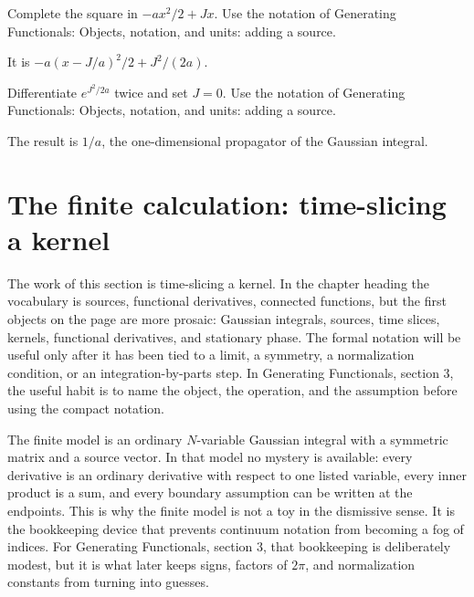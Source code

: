 \begin{exercise}
Complete the square in \(-ax^2/2+Jx\).  Use the notation of Generating Functionals: Objects, notation, and units: adding a source.
\begin{answer}
It is \(-a(x-J/a)^2/2+J^2/(2a)\).
\end{answer}
\end{exercise}

\begin{exercise}
Differentiate \(e^{J^2/2a}\) twice and set \(J=0\).  Use the notation of Generating Functionals: Objects, notation, and units: adding a source.
\begin{answer}
The result is \(1/a\), the one-dimensional propagator of the Gaussian integral.
\end{answer}
\end{exercise}



\section{The finite calculation: time-slicing a kernel}













The work of this section is time-slicing a kernel.  In the chapter heading the vocabulary is sources, functional derivatives, connected functions, but the first objects on the page are more prosaic: Gaussian integrals, sources, time slices, kernels, functional derivatives, and stationary phase.  The formal notation will be useful only after it has been tied to a limit, a symmetry, a normalization condition, or an integration-by-parts step.  In Generating Functionals, section 3, the useful habit is to name the object, the operation, and the assumption before using the compact notation.

The finite model is an ordinary \(N\)-variable Gaussian integral with a symmetric matrix and a source vector.  In that model no mystery is available: every derivative is an ordinary derivative with respect to one listed variable, every inner product is a sum, and every boundary assumption can be written at the endpoints.  This is why the finite model is not a toy in the dismissive sense.  It is the bookkeeping device that prevents continuum notation from becoming a fog of indices.  For Generating Functionals, section 3, that bookkeeping is deliberately modest, but it is what later keeps signs, factors of \(2\pi\), and normalization constants from turning into guesses.

